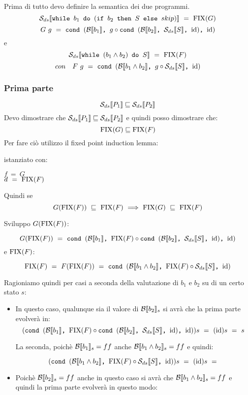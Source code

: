 {
    Prima di tutto devo definire la semantica dei due programmi.\\
    
  \[   \dsCtxt{$\exEightA{}$}~=~\fixp{G} \]
    \[ G~g~=~\cond{b_1}{g \circ \cond{b_2}{\Sds}{\idDS}}{\idDS} \]
    e
    \[ \dsCtxt{$\exEightB{}$}~=~\fixp{F} \]
     \[ con \quad    F~g~=~\cond{b_1\and{}b_2}{g \circ \Sds}{\idDS} \]
    
    \subsubsection{Prima parte} 
    \[ \dsCtxt{P_1} \mineq \dsCtxt{P_2}\]
    Devo dimostrare che $\dsCtxt{P_1} \mineq \dsCtxt{P_2}$ e quindi posso
    dimostrare che:
    \[ \fixp{G} \mineq \fixp{F} \]
    Per fare ciò utilizzo il fixed point induction lemma: 
    \fil{}
 
    istanziato con:
    \begin{center}
    $f~=~G$ \\
    $d~=~\fixp{F}$
    \end{center}
    Quindi se \[ G(\fixp{F})~\mineq~\fixp{F}~\Longrightarrow~\fixp{G}~\mineq~\fixp{F} \]
   
    Sviluppo $G(\fixp{F})$:

    \[ G(\fixp{F})~=~\cond{b_1}{\fixp{F} \circ \cond{b_2}{\Sds}{\idDS}}{\idDS} \]
    e $\fixp{F}$:
    
    \[ \fixp{F}~=~F(\fixp{F})~=~\cond{b_1\and{}b_2}{\fixp{F} \circ \Sds}{\idDS} \]

    Ragioniamo quindi per casi a seconda della valutazione di $b_1$ e $b_2$ su
    di un certo stato $s$:
    \begin{itemize}
        \item {} In questo caso, qualunque sia il
        valore di $\evalBbs{b_2}{s}$ si avrà che la prima parte evolverà in:
        \[ (\cond{b_1}{\fixp{F} \circ \cond{b_2}{\Sds}{\idDS}}{\idDS})s~=~(\idDS)s
        ~=~s \]
       
        La seconda, poichè $\evalBbs{b_1}{s}=ff$ anche
        $\evalBbs{b_1\and{}b_2}{s}=ff$ e quindi:
       
       \[  (\cond{b_1\and{}b_2}{\fixp{F} \circ \Sds}{\idDS})s~=~(\idDS)s~=~ \]
        
        \item {} 
        
        Poichè 
        $\evalBbs{b_2}{s}=ff$ anche in questo caso si avrà che 
        $\evalBbs{b_1\and{}b_2}{s}=ff$ e quindi la prima parte evolverà in
        questo modo:


\end{itemize}}
